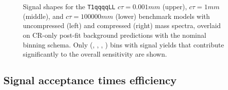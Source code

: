 \begin{figure}[!ht]
{        \label{fig:T1qqqqLL_ctau_1_uncompressed_MR_simp_with_signal}
    } \\
     ~~
     \\
    \caption{ Signal shapes for the \texttt{T1qqqqLL}
      $c\tau=0.001\unit{mm}$ (upper), $c\tau=1\unit{mm}$ (middle), and
      $c\tau=100000\unit{mm}$ (lower) benchmark models with
      uncompressed (left) and compressed (right) mass spectra,
      overlaid on CR-only post-fit background predictions with the
      nominal binning schema. Only (\njet, \nb, \scalht, \mht) bins
      with signal yields that contribute significantly to the overall
      sensitivity are shown.  }
    \label{fig:T1qqqqLL_MR_simp_with_signal}
\end{figure}

\clearpage
\subsection{Signal acceptance times efficiency}
\label{sec:sig-accept-contam-LLP}

